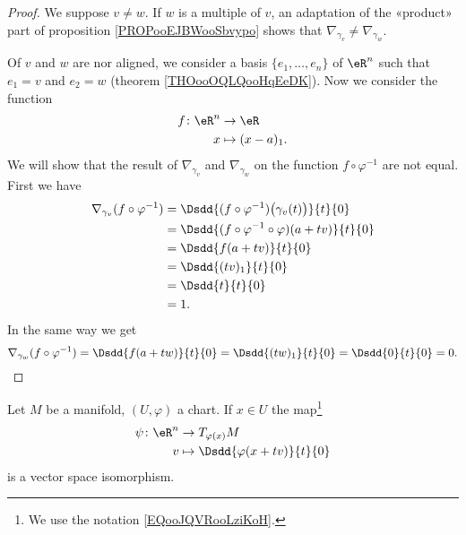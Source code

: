 \begin{proof}
    We suppose \( v\neq w\). If \( w\) is a multiple of \( v\), an adaptation of the «product» part of proposition \ref{PROPooEJBWooSbvypo} shows that \( \nabla_{\gamma_v}\neq \nabla_{\gamma_w}\).

    Of \( v\) and \( w\) are nor aligned, we consider a basis \( \{ e_1,\ldots, e_n \}\) of \( \eR^n\) such that \( e_1=v\) and \( e_2=w\) (theorem \ref{THOooOQLQooHqEeDK}). Now we consider the function
    \begin{equation}
        \begin{aligned}
            f\colon \eR^n&\to \eR \\
            x&\mapsto (x-a)_1. 
        \end{aligned}
    \end{equation}
    We will show that the result of \( \nabla_{\gamma_v}\) and \( \nabla_{\gamma_w}\) on the function \( f\circ\varphi^{-1}\) are not equal. First we have
    \begin{subequations}
        \begin{align}
            \nabla_{\gamma_v}(f\circ\varphi^{-1})&=\Dsdd{ (f\circ\varphi^{-1})\big( \gamma_v(t) \big) }{t}{0}\\
            &=\Dsdd{ (f\circ\varphi^{-1}\circ\varphi)(a+tv) }{t}{0}\\
            &=\Dsdd{ f(a+tv) }{t}{0}\\
            &=\Dsdd{ (tv)_1 }{t}{0}\\
            &=\Dsdd{ t }{t}{0}\\
            &=1.
        \end{align}
    \end{subequations}
    In the same way we get
    \begin{equation}
        \nabla_{\gamma_w}(f\circ\varphi^{-1})=\Dsdd{ f(a+tw) }{t}{0}=\Dsdd{ (tw)_1 }{t}{0}=\Dsdd{ 0 }{t}{0}=0.
    \end{equation}
\end{proof}


\begin{proposition}
    Let \( M\) be a manifold, \( (U, \varphi)\) a chart. If \( x\in U\) the map\footnote{We use the notation \eqref{EQooJQVRooLziKoH}.}
    \begin{equation}
        \begin{aligned}
            \psi\colon \eR^n&\to T_{\varphi(x)}M \\
            v&\mapsto \Dsdd{ \varphi(x+tv) }{t}{0} 
        \end{aligned}
    \end{equation}
    is a vector space isomorphism.
\end{proposition}

